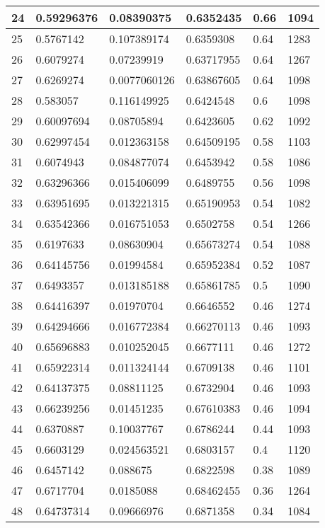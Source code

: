 \begin{longtable}{|l|l|l|l|l|l|}
24 & 0.59296376 & 0.08390375 & 0.6352435 & 0.66 & 1094 \\ \hline 
25 & 0.5767142 & 0.107389174 & 0.6359308 & 0.64 & 1283 \\ \hline 
26 & 0.6079274 & 0.07239919 & 0.63717955 & 0.64 & 1267 \\ \hline 
27 & 0.6269274 & 0.0077060126 & 0.63867605 & 0.64 & 1098 \\ \hline 
28 & 0.583057 & 0.116149925 & 0.6424548 & 0.6 & 1098 \\ \hline 
29 & 0.60097694 & 0.08705894 & 0.6423605 & 0.62 & 1092 \\ \hline 
30 & 0.62997454 & 0.012363158 & 0.64509195 & 0.58 & 1103 \\ \hline 
31 & 0.6074943 & 0.084877074 & 0.6453942 & 0.58 & 1086 \\ \hline 
32 & 0.63296366 & 0.015406099 & 0.6489755 & 0.56 & 1098 \\ \hline 
33 & 0.63951695 & 0.013221315 & 0.65190953 & 0.54 & 1082 \\ \hline 
34 & 0.63542366 & 0.016751053 & 0.6502758 & 0.54 & 1266 \\ \hline 
35 & 0.6197633 & 0.08630904 & 0.65673274 & 0.54 & 1088 \\ \hline 
36 & 0.64145756 & 0.01994584 & 0.65952384 & 0.52 & 1087 \\ \hline 
37 & 0.6493357 & 0.013185188 & 0.65861785 & 0.5 & 1090 \\ \hline 
38 & 0.64416397 & 0.01970704 & 0.6646552 & 0.46 & 1274 \\ \hline 
39 & 0.64294666 & 0.016772384 & 0.66270113 & 0.46 & 1093 \\ \hline 
40 & 0.65696883 & 0.010252045 & 0.6677111 & 0.46 & 1272 \\ \hline 
41 & 0.65922314 & 0.011324144 & 0.6709138 & 0.46 & 1101 \\ \hline 
42 & 0.64137375 & 0.08811125 & 0.6732904 & 0.46 & 1093 \\ \hline 
43 & 0.66239256 & 0.01451235 & 0.67610383 & 0.46 & 1094 \\ \hline 
44 & 0.6370887 & 0.10037767 & 0.6786244 & 0.44 & 1093 \\ \hline 
45 & 0.6603129 & 0.024563521 & 0.6803157 & 0.4 & 1120 \\ \hline 
46 & 0.6457142 & 0.088675 & 0.6822598 & 0.38 & 1089 \\ \hline 
47 & 0.6717704 & 0.0185088 & 0.68462455 & 0.36 & 1264 \\ \hline 
48 & 0.64737314 & 0.09666976 & 0.6871358 & 0.34 & 1084 \\ \hline 

\end{longtable}
